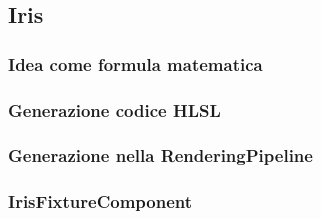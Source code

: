 \documentclass[main.tex]{subfiles}
\begin{document}
\subsection{Iris}\label{subsec:5_Iris}

\subsubsection{Idea come formula matematica}\label{subsec:5_2_IrisMath}

\subsubsection{Generazione codice HLSL}\label{subsec:5_2_IrisHlsl}

\subsubsection{Generazione nella RenderingPipeline}\label{subsec:5_2_IrisRenderingPipeline}

\subsubsection{IrisFixtureComponent}\label{subsec:5_1_IrisFixtureComponent}
\end{document}
